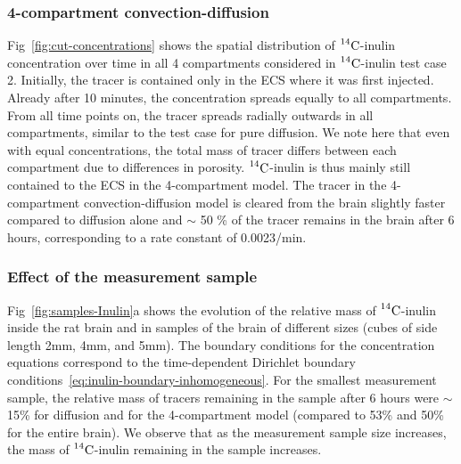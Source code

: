 \documentclass[a4paper,11pt]{article}
\newcommand{\ie}{\emph{i.e.}\;}
\newcommand{\1}{^{(1)}}
\newcommand{\2}{^{(2)}}
\newcommand{\Cinulin}{$\prescript{14}{}{\text{C}}$-inulin }
\begin{document}
\subsubsection{4-compartment convection-diffusion}
\label{subsec:baseline2}

Fig~\ref{fig:cut-concentrations} shows the spatial distribution of \Cinulin concentration over time in all 4 compartments considered in \Cinulin test case 2. Initially, the tracer is contained only in the ECS where it was first injected. Already after 10 minutes, the concentration spreads equally to all compartments. From all time points on, the tracer spreads radially outwards in all compartments, similar to the test case for pure diffusion. We note here that even with equal concentrations, the total mass of tracer differs between each compartment due to differences in porosity. \Cinulin is thus mainly still contained to the ECS in the 4-compartment model. The tracer in the 4-compartment convection-diffusion model is cleared from the brain slightly faster compared to diffusion alone and $\sim$ 50  
\% of the tracer remains in the brain after 6 hours, corresponding to a rate constant of 0.0023/min. 


\subsubsection{Effect of the measurement sample} 
Fig~\ref{fig:samples-Inulin}a shows the evolution of the relative mass of \Cinulin inside the rat brain and in samples of the brain of different sizes (cubes of side length 2\si{mm}, 4\si{mm}, and 5\si{mm}). The boundary conditions for the concentration equations correspond to the time-dependent Dirichlet boundary conditions~\eqref{eq:inulin-boundary-inhomogeneous}. For the smallest measurement sample, the relative mass of tracers remaining in the sample after 6 hours were $\sim$15\% for diffusion and for the 4-compartment model (compared to 53\% and 50\%
for the entire brain). We observe that as the measurement sample size increases, the mass of \Cinulin remaining in the sample increases.
\end{document}
